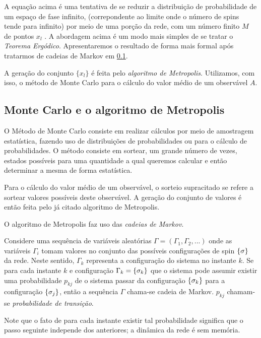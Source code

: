A equação acima é uma tentativa de se reduzir a distribuição de probabilidade de um espaço de fase infinito, (correpondente ao limite onde o número de spins tende para infinito) por meio de uma porção da rede, com um número finito $M$ de pontos $x_l$ \cite{IsingSim}. A abordagem acima é um modo mais simples de se tratar o \textit{Teorema Ergódico}. Apresentaremos o resultado de forma mais formal após tratarmos de cadeias de Markov em \ref{subsec:MonteCarloEMetropolis}.

A geração do conjunto $\{x_l\}$ é feita pelo \textit{algoritmo de Metropolis}. Utilizamos, com isso, o método de Monte Carlo para o cálculo do valor médio de um observável $A$.


\subsection{Monte Carlo e o algoritmo de Metropolis}
\label{subsec:MonteCarloEMetropolis}

O Método de Monte Carlo consiste em realizar cálculos por meio de amostragem estatística, fazendo uso de distribuições de probabilidades ou para o cálculo de probabilidades. O método consiste em sortear, um grande número de vezes, estados possíveis para uma quantidade a qual queremos calcular e então determinar a mesma de forma estatística. 

Para o cálculo do valor médio de um observável, o sorteio supracitado se refere a sortear valores possíveis deste observável. A geração do conjunto de valores é então feita pelo já citado algoritmo de Metropolis. 

O algoritmo de Metropolis faz uso das \textit{cadeias de Markov}. 

\vspace*{1.5mm} 
 Considere uma sequência de variáveis aleatórias $\Gamma=( \Gamma_1, \Gamma_2, ... )$ onde as variáveis $\Gamma_i$ tomam valores no conjunto das possíveis configurações de spin $\{ \sigma \}$ da rede. Neste sentido, $\Gamma_k$ representa a configuração do sistema no instante $k$. Se para cada instante $k$ e configuração $\Gamma_k = \{ \sigma_k \}$ que o sistema pode assumir existir uma probabilidade $p_{kj}$ de o sistema passar da configuração $\{ \sigma_k \}$ para a configuração $\{ \sigma_j \}$, então a sequência $\Gamma$ chama-se cadeia de Markov. $p_{kj}$ chamam-se \textit{probabilidade de transição}.

Note que o fato de para cada instante existir tal probabilidade significa que o passo seguinte independe dos anteriores; a dinâmica da rede é sem memória. 

